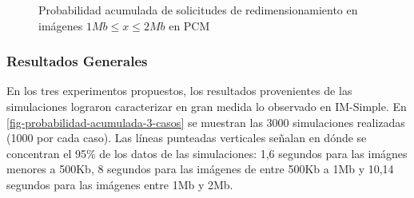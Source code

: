 %
\begin{figure}
\hspace{-2cm}
\caption{Probabilidad acumulada de solicitudes de redimensionamiento en imágenes $1Mb \leq x \leq 2Mb$ en PCM}
\label{fig:funcion-acumulada-palladio-2mb}
\end{figure}

\subsubsection{Resultados Generales}
En los tres experimentos propuestos, los resultados provenientes de las simulaciones lograron caracterizar en gran medida lo observado en IM-Simple. En \ref{fig-probabilidad-acumulada-3-casos} se muestran las 3000 simulaciones realizadas (1000 por cada caso). Las líneas punteadas verticales señalan en dónde se concentran el 95\% de los datos de las simulaciones: 1,6 segundos para las imágnes menores a 500Kb, 8 segundos para las imágenes de entre 500Kb a 1Mb y 10,14 segundos para las imágenes entre 1Mb y 2Mb. 

